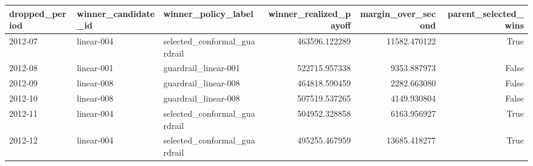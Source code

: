 \begin{tabular}{lllrrr}
\toprule
dropped\_period & winner\_candidate\_id & winner\_policy\_label & winner\_realized\_payoff & margin\_over\_second & parent\_selected\_wins \\
\midrule
2012-07 & linear-004 & selected\_conformal\_guardrail & 463596.122289 & 11582.470122 & True \\
2012-08 & linear-001 & guardrail\_linear-001 & 522715.957338 & 9353.887973 & False \\
2012-09 & linear-008 & guardrail\_linear-008 & 464818.590459 & 2282.663080 & False \\
2012-10 & linear-008 & guardrail\_linear-008 & 507519.537265 & 4149.930804 & False \\
2012-11 & linear-004 & selected\_conformal\_guardrail & 504952.328858 & 6163.956927 & True \\
2012-12 & linear-004 & selected\_conformal\_guardrail & 495255.467959 & 13685.418277 & True \\
\bottomrule
\end{tabular}

